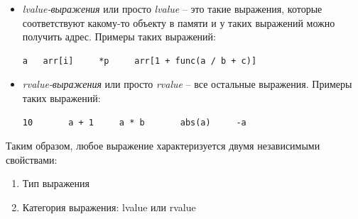 \documentclass{article}
\begin{document}
\begin{itemize}
\item \textit{lvalue-выражения} или просто \textit{lvalue} -- это такие выражения, которые соответствуют какому-то объекту в памяти и у таких выражений можно получить адрес. Примеры таких выражений:
\begin{lstlisting}
a	arr[i]	   *p     arr[1 + func(a / b + c)]
\end{lstlisting}
\item \textit{rvalue-выражения} или просто \textit{rvalue} -- все остальные выражения.
Примеры таких выражений:
\begin{lstlisting}
10       a + 1     a * b       abs(a)     -a
\end{lstlisting}
\end{itemize}
Таким образом, любое выражение характеризуется двумя независимыми свойствами:
\begin{enumerate}
\item Тип выражения
\item Категория выражения: lvalue или rvalue
\end{enumerate}
\end{document}
